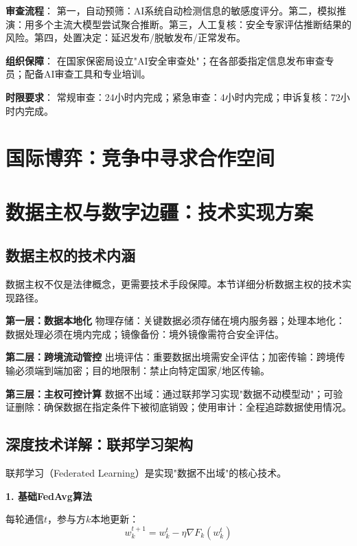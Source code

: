 \textbf{审查流程}：
第一，自动预筛：AI系统自动检测信息的敏感度评分。第二，模拟推演：用多个主流大模型尝试聚合推断。第三，人工复核：安全专家评估推断结果的风险。第四，处置决定：延迟发布/脱敏发布/正常发布。

\textbf{组织保障}：
在国家保密局设立"AI安全审查处"；在各部委指定信息发布审查专员；配备AI审查工具和专业培训。

\textbf{时限要求}：
常规审查：24小时内完成；紧急审查：4小时内完成；申诉复核：72小时内完成。

\section{国际博弈：竞争中寻求合作空间}


\section{数据主权与数字边疆：技术实现方案}

\subsection{数据主权的技术内涵}

数据主权不仅是法律概念，更需要技术手段保障。本节详细分析数据主权的技术实现路径\cite{DataSovereignty2024, EUDataAct2024, ChinaDataSecurity2024}。

\textbf{第一层：数据本地化}
物理存储：关键数据必须存储在境内服务器；处理本地化：数据处理必须在境内完成；镜像备份：境外镜像需符合安全评估。

\textbf{第二层：跨境流动管控}
出境评估：重要数据出境需安全评估；加密传输：跨境传输必须端到端加密；目的地限制：禁止向特定国家/地区传输。

\textbf{第三层：主权可控计算}
数据不出域：通过联邦学习实现"数据不动模型动"；可验证删除：确保数据在指定条件下被彻底销毁；使用审计：全程追踪数据使用情况。

\subsection{深度技术详解：联邦学习架构}

联邦学习（Federated Learning）是实现"数据不出域"的核心技术\cite{FederatedLearning2024, GoogleFL2024, FedAvg2024}。

\textbf{1. 基础FedAvg算法}

每轮通信$t$，参与方$k$本地更新：
\begin{equation}
w_k^{t+1} = w_k^t - \eta \nabla F_k(w_k^t)
\end{equation}

